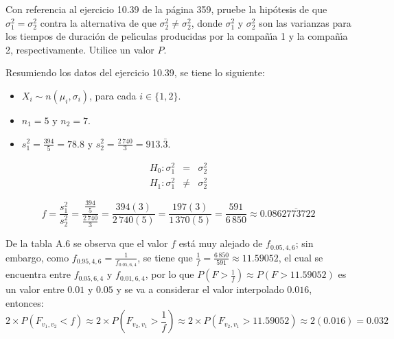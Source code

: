 \begin{enunciado}
 Con referencia al ejercicio 10.39 de la p\'agina 359, pruebe la hip\'otesis
 de que $\sigma_1^2 = \sigma_2^2$ contra la alternativa
 de que $\sigma_2^2 \neq \sigma_2^2$,
 donde $\sigma_1^2$ y $\sigma_2^2$ son las varianzas para los tiempos
 de duraci\'on de pel\'{\i}culas producidas
 por la compa\~n\'{\i}a 1 y la compa\~n\'{\i}a 2, respectivamente.
 Utilice un valor $P$.
\end{enunciado}

\begin{solucion}
 Resumiendo los datos del ejercicio 10.39, se tiene lo siguiente:
 \begin{itemize}
  \item $X_i \sim n\left( \mu_i, \sigma_i \right)$,
  para cada $i \in \{ 1,2 \}$.
  \item $n_1 = 5$ y $n_2 = 7$.
  \item $s_1^2 = \frac{394}{5} = 78.8$
  y $s_2^2 = \frac{2\,740}{3} = 913.\bar{3}$.
 \end{itemize}

 \begin{hipotesis}
  \begin{eqnarray*}
   H_0: \sigma_1^2 &  =   & \sigma_2^2 \\
   H_1: \sigma_1^2 & \neq & \sigma_2^2
  \end{eqnarray*}
 \end{hipotesis}

 \begin{estadistico}
  \begin{equation*}
   f = \frac{s_1^2}{s_2^2}
   = \frac{\displaystyle{\frac{394}{5}}}{\displaystyle{\frac{2\,740}{3}}}
   = \frac{394(3)}{2\,740(5)} = \frac{197(3)}{1\,370(5)}
   = \frac{591}{6\,850} \approx 0.08\overline{62773722}
  \end{equation*}
 \end{estadistico}

 \begin{valorp}
  De la tabla A.6 se observa que el valor $f$
  est\'a muy alejado de $f_{0.05,4,6}$;
  sin embargo, como $f_{0.95,4,6} = \frac{1}{f_{0.05,6,4}}$,
  se tiene que $\frac{1}{f} = \frac{6\,850}{591} \approx 11.59052$,
  el cual se encuentra entre $f_{0.05,6,4}$ y $f_{0.01,6,4}$, por lo que
  $P\left(F>\frac{1}{f}\right) \approx P(F > 11.59052)$ es un valor
  entre $0.01$ y $0.05$ y se va a considerar el valor interpolado $0.016$,
  entonces:
  \begin{equation*}
   2\times P\left( F_{v_1,v_2} < f\right)
   \approx 2\times P\left( F_{v_2,v_1} > \frac{1}{f}  \right)
   \approx 2\times P\left( F_{v_2,v_1} > 11.59052 \right)
   \approx 2(0.016) = 0.032
  \end{equation*}
 \end{valorp}


\end{solucion}
